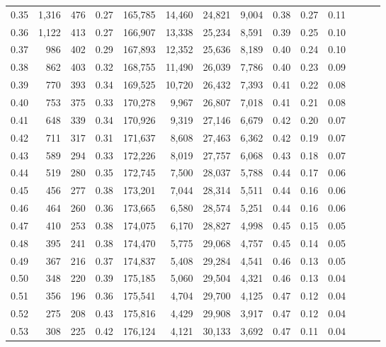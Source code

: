 \begin{tabular}{rrrrrrrrrrrrrr}
0.35 &  1,316 &    476 &  0.27 &  165,785 &   14,460 &  24,821 &   9,004 &  0.38 &  0.27 &      0.11 \\
0.36 &  1,122 &    413 &  0.27 &  166,907 &   13,338 &  25,234 &   8,591 &  0.39 &  0.25 &      0.10 \\
0.37 &    986 &    402 &  0.29 &  167,893 &   12,352 &  25,636 &   8,189 &  0.40 &  0.24 &      0.10 \\
0.38 &    862 &    403 &  0.32 &  168,755 &   11,490 &  26,039 &   7,786 &  0.40 &  0.23 &      0.09 \\
0.39 &    770 &    393 &  0.34 &  169,525 &   10,720 &  26,432 &   7,393 &  0.41 &  0.22 &      0.08 \\
0.40 &    753 &    375 &  0.33 &  170,278 &    9,967 &  26,807 &   7,018 &  0.41 &  0.21 &      0.08 \\
0.41 &    648 &    339 &  0.34 &  170,926 &    9,319 &  27,146 &   6,679 &  0.42 &  0.20 &      0.07 \\
0.42 &    711 &    317 &  0.31 &  171,637 &    8,608 &  27,463 &   6,362 &  0.42 &  0.19 &      0.07 \\
0.43 &    589 &    294 &  0.33 &  172,226 &    8,019 &  27,757 &   6,068 &  0.43 &  0.18 &      0.07 \\
0.44 &    519 &    280 &  0.35 &  172,745 &    7,500 &  28,037 &   5,788 &  0.44 &  0.17 &      0.06 \\
0.45 &    456 &    277 &  0.38 &  173,201 &    7,044 &  28,314 &   5,511 &  0.44 &  0.16 &      0.06 \\
0.46 &    464 &    260 &  0.36 &  173,665 &    6,580 &  28,574 &   5,251 &  0.44 &  0.16 &      0.06 \\
0.47 &    410 &    253 &  0.38 &  174,075 &    6,170 &  28,827 &   4,998 &  0.45 &  0.15 &      0.05 \\
0.48 &    395 &    241 &  0.38 &  174,470 &    5,775 &  29,068 &   4,757 &  0.45 &  0.14 &      0.05 \\
0.49 &    367 &    216 &  0.37 &  174,837 &    5,408 &  29,284 &   4,541 &  0.46 &  0.13 &      0.05 \\
0.50 &    348 &    220 &  0.39 &  175,185 &    5,060 &  29,504 &   4,321 &  0.46 &  0.13 &      0.04 \\
0.51 &    356 &    196 &  0.36 &  175,541 &    4,704 &  29,700 &   4,125 &  0.47 &  0.12 &      0.04 \\
0.52 &    275 &    208 &  0.43 &  175,816 &    4,429 &  29,908 &   3,917 &  0.47 &  0.12 &      0.04 \\
0.53 &    308 &    225 &  0.42 &  176,124 &    4,121 &  30,133 &   3,692 &  0.47 &  0.11 &      0.04 \\

\end{tabular}
